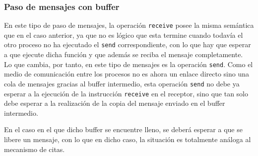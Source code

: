 \subsubsection{Paso de mensajes con buffer}
En este tipo de paso de mensajes, la operación \verb|receive| posee la misma semántica que en el caso anterior, ya que no es lógico que esta termine cuando todavía el otro proceso no ha ejecutado el \verb|send| correspondiente, con lo que hay que esperar a que ejecute dicha función y que además se reciba el mensaje completamente.\\

Lo que cambia, por tanto, en este tipo de mensajes es la operación \verb|send|. Como el medio de comunicación entre los procesos no es ahora un enlace directo sino una cola de mensajes gracias al buffer intermedio, esta operación \verb|send| no debe ya esperar a la ejecución de la instrucción \verb|receive| en el receptor, sino que tan solo debe esperar a la realización de la copia del mensaje enviado en el buffer intermedio.

En el caso en el que dicho buffer se encuentre lleno, se deberá esperar a que se libere un mensaje, con lo que en dicho caso, la situación es totalmente análoga al mecanismo de citas.\\

